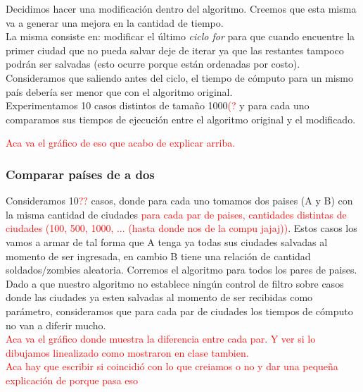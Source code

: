 \documentclass[a4paper]{article}
\begin{document}
Decidimos hacer una modificaci\'on dentro del algoritmo. Creemos que esta misma va a generar una mejora en la cantidad de tiempo.\\

La misma consiste en: modificar el \'ultimo \emph{ciclo for} para que cuando encuentre la primer ciudad que no pueda salvar deje de iterar ya que las restantes tampoco podr\'an ser salvadas (esto ocurre porque est\'an ordenadas por costo).\\

Consideramos que saliendo antes del ciclo, el tiempo de c\'omputo para un mismo pa\'is deber\'ia ser menor que con el algoritmo original.\\

Experimentamos 10 casos distintos de tama\~no 1000\textcolor{red}{(?} y para cada uno comparamos sus tiempos de ejecuci\'on entre el algoritmo original y el modificado.

\textcolor{red}{Aca va el gr\'afico de eso que acabo de explicar arriba.}

\newpage
\subsubsection{Comparar pa\'ises de a dos}

Consideramos 10\textcolor{red}{??} casos, donde para cada uno tomamos dos paises (A y B) con la misma cantidad de ciudades \textcolor{red}{para cada par de paises, cantidades distintas de ciudades (100, 500, 1000, ... (hasta donde nos de la compu jajaj))}. Estos casos los vamos a armar de tal forma que A tenga ya todas sus ciudades salvadas al momento de ser ingresada, en cambio B tiene una relaci\'on de cantidad soldados/zombies aleatoria. Corremos el algoritmo para todos los pares de paises.\\

Dado a que nuestro algoritmo no establece ning\'un control de filtro sobre casos donde las ciudades ya esten salvadas al momento de ser recibidas como par\'ametro, consideramos que para cada par de ciudades los tiempos de c\'omputo no van a diferir mucho.\\

\textcolor{red}{Aca va el gr\'afico donde muestra la diferencia entre cada par. Y ver si lo dibujamos linealizado como mostraron en clase tambien.}\\

\textcolor{red}{Aca hay que escribir si coincidi\'o con lo que creiamos o no y dar una peque\~na explicaci\'on de porque pasa eso}
\end{document}
